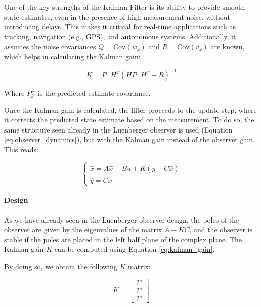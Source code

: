 One of the key strengths of the Kalman Filter is its ability to provide smooth state estimates, even in the presence of high measurement noise, without introducing delays.
This makes it critical for real-time applications such as tracking, navigation (e.g., GPS), and autonomous systems.
Additionally, it assumes the noise covariances $Q = \text{Cov}(w_k)$ and $R = \text{Cov}(v_k)$ are known, which helps in calculating the Kalman gain:

\begin{equation}
    K = P^- H^T (H P^- H^T + R)^{-1}
    \label{eq:kalman_gain}
\end{equation}

Where $P_k^-$ is the predicted estimate covariance.

Once the Kalman gain is calculated, the filter proceeds to the update step, where it corrects the predicted state estimate based on the measurement.
To do so, the same structure seen already in the Luenberger observer is used (Equation \ref{eq:observer_dynamics}), but with the Kalman gain instead of the observer gain.
This reads:

\begin{equation}
    \begin{cases}
        \dot{\hat{x}} = A \hat{x} + B u + K(y - C \hat{x}) \\
        \hat{y} = C \hat{x}
    \end{cases}
\end{equation}


\paragraph{Design}

As we have already seen in the Luenberger observer design, the poles of the observer are given by the eigenvalues of the matrix $A - KC$, and the observer is stable if the poles are placed in the left half plane of the complex plane.
The Kalman gain $K$ can be computed using Equation \ref{eq:kalman_gain}.

By doing so, we obtain the following $K$ matrix:

\begin{equation}
    K = \begin{bmatrix}
        ?? \\
        ?? \\
        ??
    \end{bmatrix}
    \label{eq:kalman_gain_matrix}
\end{equation}

